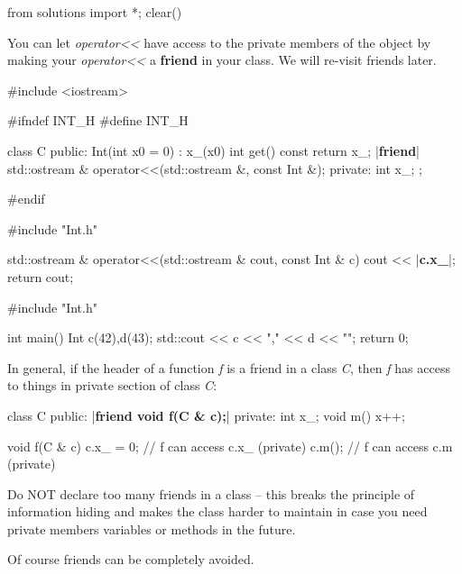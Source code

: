 \begin{python0}
from solutions import *; clear()
\end{python0}

You can let \textit{operator<<} have access to the
private members of the object by making your
\textit{operator<<} a \textbf{friend} in your class. We
will re-visit friends later.

\begin{consolethree}[escapeinside=||]
#include <iostream>

#ifndef INT_H
#define INT_H

class C
{
public:
    Int(int x0 = 0)
        : x_(x0)
    {}
    int get() const { return x_; }
    |{\bf friend}| std::ostream & operator<<(std::ostream &, const Int &);
private:
    int x_;
};

#endif
\end{consolethree}

\begin{consolethree}[escapeinside=||]
#include "Int.h"

std::ostream & operator<<(std::ostream & cout, const Int & c)
{
    cout << |{\bf c.x\_}|;
    return cout;
}
\end{consolethree}

\begin{consolethree}[escapeinside=||]
#include "Int.h"

int main()
{
    Int c(42),d(43);
    std::cout << c << "," << d << "\n";
    return 0;
}
\end{consolethree}

In general, if the header of a function \textit{f} is a friend in a class
\textit{C}, then \textit{f} has access to things in private section of class
\textit{C}:

\begin{consolethree}[escapeinside=||]
class C
{
public:
    |{\bf friend void f(C \& c);}|
private:
    int x_;
    void m() { x++; }
}

void f(C & c)
{
    c.x_ = 0; // f can access c.x_ (private)
    c.m(); // f can access c.m (private)
}
\end{consolethree}

Do NOT declare too many friends in a class -- this breaks the principle
of information hiding and makes the class harder to maintain in case you
need private members variables or methods in the future.

Of course friends can be completely avoided.


